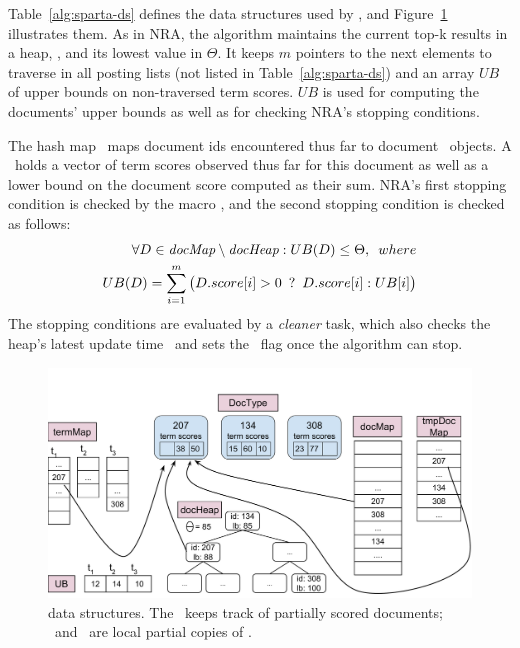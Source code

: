 Table~\ref{alg:sparta-ds} defines the data structures used by \alg,
and Figure~\ref{fig:sparta_ds} illustrates them. 
As in NRA, the algorithm maintains the current top-k results in a heap, \DHeap, and its lowest value in $\Theta$. It keeps $m$ pointers to the next elements to traverse in all posting lists (not listed in Table~\ref{alg:sparta-ds})
and an array $UB$ of upper bounds on non-traversed term scores. 
$UB$ is used for computing the documents' upper bounds 
as well as for checking NRA's  stopping conditions.   

The hash map 
\DMap\ maps  document ids encountered thus far to document \Docobj\ objects. A \Docobj\ holds a vector of term scores observed thus far for this document as well as a lower bound on the document score computed as their sum.
NRA's first stopping condition is checked by the macro \RAStop, and the 
second stopping condition is checked as follows: 
\begin{equation} \label{eq:stop2}
\begin{split}
\forall D\in \textit{docMap} \setminus \textit{docHeap} : UB(D) \le \Theta, \enskip where \\
UB(D) = \sum_{i=1}^m \big(D.score[i] > 0 \enskip ? \enskip D.score[i] : UB[i] \big)
\end{split}
\end{equation}
The stopping conditions are evaluated by a \emph{cleaner} task,
which also checks the heap's latest update time \HeapUpdateTime\ and 
sets the \Done\ flag once the algorithm can stop.

\begin{figure}[tbh]
\centering
\includegraphics[width=\columnwidth]{figures/localData}
\caption{\alg\/ data structures. The \DMap\ keeps track of partially scored documents; \LDMap\ and \TMap\ are local partial copies of \DMap.}
\label{fig:sparta_ds}
\end{figure}

